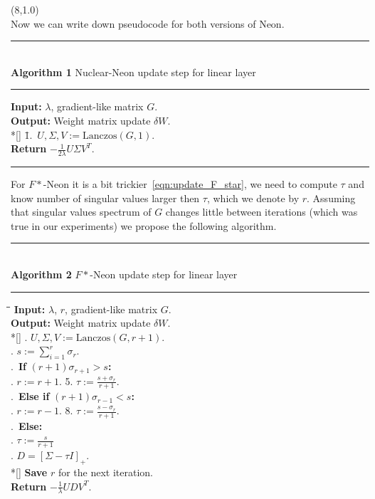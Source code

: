 \documentclass[a0]{a0poster}
\def\Head#1{\noindent{\LARGE\color{black} #1}\bigskip}
\begin{document}
\begin{textblock}{7.0}(8,1.0)
\Head{Algorithms}\\
Now we can write down pseudocode for both versions of Neon.

{\footnotesize{}
\noindent\rule[-5pt]{.8\textwidth}{0.4pt}\\
{\bf Algorithm 1} Nuclear-Neon update step for linear layer\\
\noindent\rule[5pt]{.8\textwidth}{0.4pt}
\vspace{-15pt}
\noindent\begin{tabbing}
    {\bf Input:} $\lambda$, gradient-like matrix $G$. \\
    {\bf Output:} Weight matrix update $\delta W$.\\*[\smallskipamount]
    \qquad \= 1.\ $U, \Sigma, V := \textrm{Lanczos}(G, 1)$. \\
    {\bf Return} $-\frac{1}{2\lambda}U \Sigma V^T$.
\end{tabbing}
\vspace{-8pt}
\noindent\rule[10pt]{.8\textwidth}{0.4pt}
}

For $F*$-Neon it is a bit trickier~\eqref{eqn:update_F_star}, we need to compute $\tau$ and know number of singular values larger then $\tau$, which we denote by $r$. Assuming that singular values spectrum of $G$ changes little between iterations (which was true in our experiments) we propose the following algorithm.

{\footnotesize{}
\noindent\rule[-5pt]{.8\textwidth}{0.4pt}\\
{\bf Algorithm 2} $F*$-Neon update step for linear layer\\
\noindent\rule[5pt]{.8\textwidth}{0.4pt}
\vspace{-15pt}
\noindent\begin{tabbing}
    \qquad\=\qquad\=\qquad\=\kill %
    {\bf Input:} $\lambda$, $r$, gradient-like matrix $G$. \\
    {\bf Output:} Weight matrix update $\delta W$.\\*[\smallskipamount]
    . $U, \Sigma, V := \textrm{Lanczos}(G, r + 1)$. \\
    . $s := \sum_{i=1}^{r}\sigma_r$. \\
    .\ {\bf If} $(r + 1)\sigma_{r + 1} > s${\bf:}\\
    \>. $r := r + 1$. 5. $\tau := \frac{s + \sigma_{r}}{r + 1}$.\\
    .\ {\bf Else if} $(r + 1)\sigma_{r - 1} < s${\bf:}\\
    \>. $r := r - 1$. 8. $\tau := \frac{s - \sigma_{r}}{r + 1}$.\\
    .\ {\bf Else:}\\
    \>. $\tau := \frac{s}{r + 1}$\\
    . $D = [\Sigma - \tau I]_+$. \\*[\smallskipamount]
    {\bf Save} $r$ for the next iteration.\\
    {\bf Return} $-\frac{1}{\lambda}U D V^T$.
\end{tabbing}
\vspace{10pt}
}


\end{textblock}
\end{document}
